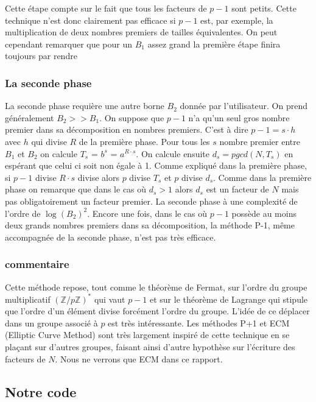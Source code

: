 \documentclass[10pt,a4paper]{report}
\begin{document}
	 Cette étape compte sur le fait que tous les facteurs de $p-1$ sont petits. Cette technique n'est donc clairement pas efficace si $p-1$ est, par exemple, la multiplication de deux nombres premiers de tailles équivalentes. On peut cependant remarquer que pour un $B_1$ assez grand la première étape finira toujours par rendre

\subsubsection{La seconde phase}	

	La seconde phase requière une autre borne $B_2$ donnée par l'utilisateur. On prend généralement $B_2>>B_1$. On suppose que $p-1$ n'a qu'un seul gros nombre premier dans sa décomposition en nombres premiers. C'est à dire $p-1 = s \cdot h $ avec $h$ qui divise $R$ de la première phase. Pour tous les $s$ nombre premier entre $B_1$ et $B_2$ on calcule $T_s$ = $b^s$ = $a^{R \cdot s}$. On calcule ensuite $d_s = pgcd(N,T_s)$ en espérant que celui ci soit non égale à 1. Comme expliqué dans la première phase, si $p-1$ divise $R \cdot s$ divise alors $p$ divise $T_s$ et $p$ divise $d_s$. Comme dans la première phase on remarque que dans le cas où $d_s > 1$ alors $d_s$ est un facteur de $N$ mais pas obligatoirement un facteur premier. La seconde phase à une complexité de l'ordre de $\log(B_2)^2$. Encore une fois, dans le cas où $p-1$ possède au moins deux grands nombres premiers dans sa décomposition, la méthode P-1, même accompagnée de la seconde phase, n'est pas très efficace.
	
	\subsubsection{commentaire}
	
	Cette méthode repose, tout comme le théorème de Fermat, sur l'ordre du groupe multiplicatif $(\mathbb{Z}/p\mathbb{Z})^*$ qui vaut $p-1$ et sur le théorème de Lagrange qui stipule que l'ordre d'un élément divise forcément l'ordre du groupe. L'idée de ce déplacer dans un groupe associé à $p$ est très intéressante. Les méthodes P+1 et ECM (Elliptic Curve Method) sont très largement inspiré de cette technique en se plaçant sur d'autres groupes, faisant ainsi d'autre hypothèse sur l'écriture des facteurs de $N$. Nous ne verrons que ECM dans ce rapport.

\subsection{Notre code}
\end{document}
